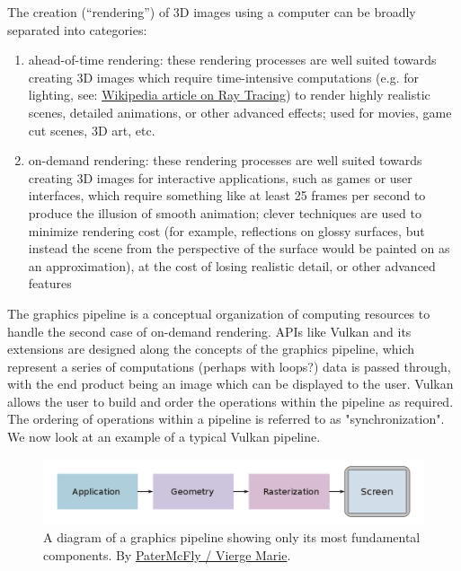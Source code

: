 \documentclass[12pt,letterpaper]{article}
\newcommand{\inquotes}[1]{``#1''}	%
\begin{document}
    The creation (\inquotes{rendering}) of 3D images using a computer can be broadly separated into categories:
        \begin{enumerate}
            \item ahead-of-time rendering: these rendering processes are well suited towards creating 3D images which require time-intensive computations (e.g. for lighting, see: \href{https://en.wikipedia.org/wiki/Ray_tracing_(graphics)}{Wikipedia article on Ray Tracing}) to render highly realistic scenes, detailed animations, or other advanced effects; used for movies, game cut scenes, 3D art, etc.
            
            \item on-demand rendering: these rendering processes are well suited towards creating 3D images for interactive applications, such as games or user interfaces, which require something like at least 25 frames per second to produce the illusion of smooth animation; clever techniques are used to minimize rendering cost (for example, reflections on glossy surfaces, but instead the scene from the perspective of the surface would be painted on as an approximation), at the cost of losing realistic detail, or other advanced features
        \end{enumerate}

    
    The graphics pipeline is a conceptual organization of computing resources to handle the second case of on-demand rendering. APIs like Vulkan and its extensions are designed along the concepts of the graphics pipeline, which represent a series of computations (perhaps with loops?) data is passed through, with the end product being an image which can be displayed to the user. Vulkan allows the user to build and order the operations within the pipeline as required. The ordering of operations within a pipeline is referred to as "synchronization". We now look at an example of a typical Vulkan pipeline.
    
    \begin{figure}
        \centering
        \includegraphics[width=0.7\linewidth]{gfx-pipeline-simple}
        \caption{A diagram of a graphics pipeline showing only its most fundamental components. By \href{https://commons.wikimedia.org/wiki/File:Graphics_pipeline_2_en.svg}{PaterMcFly / Vierge Marie}.}
        \label{fig:graphicspipeline2en}
    \end{figure}
    
\end{document}
